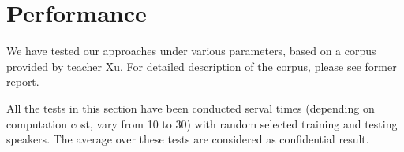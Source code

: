 \section{Performance}
\label{sec:result}
We have tested our approaches under various parameters, based on a corpus provided by teacher Xu.
For detailed description of the corpus, please see former report.

All the tests in this section have been conducted serval times
(depending on computation cost, vary from 10 to 30)
with random selected training and testing speakers.
The average over these tests are considered as confidential result.




